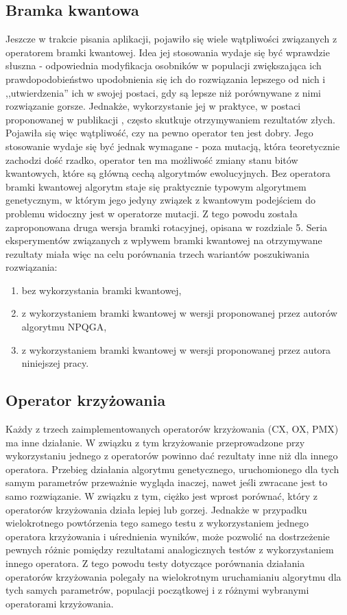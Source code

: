 \subsection{Bramka kwantowa}
Jeszcze w trakcie pisania aplikacji, pojawiło się wiele wątpliwości związanych z operatorem bramki kwantowej. Idea jej stosowania wydaje się być wprawdzie słuszna - odpowiednia modyfikacja osobników w populacji zwiększająca ich prawdopodobieństwo upodobnienia się ich do rozwiązania lepszego od nich i ,,utwierdzenia'' ich w swojej postaci, gdy są lepsze niż porównywane z nimi rozwiązanie gorsze. Jednakże, wykorzystanie jej w praktyce, w postaci proponowanej w publikacji \cite{NPQGA}, często skutkuje otrzymywaniem rezultatów złych. Pojawiła się więc wątpliwość, czy na pewno operator ten jest dobry. Jego stosowanie wydaje się być jednak wymagane - poza mutacją, która teoretycznie zachodzi dość rzadko, operator ten ma możliwość zmiany stanu bitów kwantowych, które są główną cechą algorytmów ewolucyjnych. Bez operatora bramki kwantowej algorytm staje się praktycznie typowym algorytmem genetycznym, w którym jego jedyny związek z kwantowym podejściem do problemu widoczny jest w operatorze mutacji. Z tego powodu została zaproponowana druga wersja bramki rotacyjnej, opisana w rozdziale 5. Seria eksperymentów związanych z wpływem bramki kwantowej na otrzymywane rezultaty miała więc na celu porównania trzech wariantów poszukiwania rozwiązania:
\begin{enumerate}
\item bez wykorzystania bramki kwantowej,
\item z wykorzystaniem bramki kwantowej w wersji proponowanej przez autorów algorytmu NPQGA,
\item z wykorzystaniem bramki kwantowej w wersji proponowanej przez autora niniejszej pracy. 
\end{enumerate}

\subsection{Operator krzyżowania}
Każdy z trzech zaimplementowanych operatorów krzyżowania (CX, OX, PMX) ma inne działanie. W związku z tym krzyżowanie przeprowadzone przy wykorzystaniu jednego z operatorów powinno dać rezultaty inne niż dla innego operatora. Przebieg działania algorytmu genetycznego, uruchomionego dla tych samym parametrów przeważnie wygląda inaczej, nawet jeśli zwracane jest to samo rozwiązanie. W związku z tym, ciężko jest wprost porównać, który z operatorów krzyżowania działa lepiej lub gorzej. Jednakże w przypadku wielokrotnego powtórzenia tego samego testu z wykorzystaniem jednego operatora krzyżowania i uśrednienia wyników, może pozwolić na dostrzeżenie pewnych różnic pomiędzy rezultatami analogicznych testów z wykorzystaniem innego operatora. Z tego powodu testy dotyczące porównania działania operatorów krzyżowania polegały na wielokrotnym uruchamianiu algorytmu dla tych samych parametrów, populacji początkowej i z różnymi wybranymi operatorami krzyżowania.

